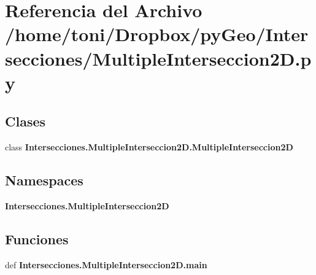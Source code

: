 \section{Referencia del Archivo /home/toni/\-Dropbox/py\-Geo/\-Intersecciones/\-Multiple\-Interseccion2\-D.py}
\label{MultipleInterseccion2D_8py}
\subsection*{Clases}
\begin{DoxyCompactItemize}
\item 
class {\bf Intersecciones.\-Multiple\-Interseccion2\-D.\-Multiple\-Interseccion2\-D}
\end{DoxyCompactItemize}
\subsection*{Namespaces}
\begin{DoxyCompactItemize}
\item 
{\bf Intersecciones.\-Multiple\-Interseccion2\-D}
\end{DoxyCompactItemize}
\subsection*{Funciones}
\begin{DoxyCompactItemize}
\item 
def {\bf Intersecciones.\-Multiple\-Interseccion2\-D.\-main}
\end{DoxyCompactItemize}
